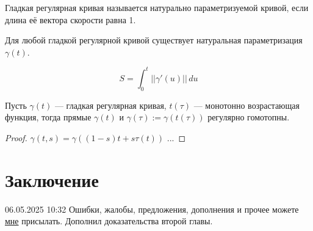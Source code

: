 \begin{definition}
    Гладкая регулярная кривая называется натурально параметризуемой кривой, если длина её вектора скорости равна 1.
\end{definition} 

\begin{statement}
    Для любой гладкой регулярной кривой существует натуральная параметризация $\gamma(t)$.
\end{statement} 

$$S = \int_{0}^{t} ||\gamma'(u)|| \,du$$

\begin{statement}
    Пусть $\gamma(t)$ — гладкая регулярная кривая, $t(\tau)$ — монотонно возрастающая функция, тогда прямые $\gamma(t)$ и $\gamma(\tau):= \gamma(t(\tau))$ регулярно гомотопны.
\end{statement} 
\begin{proof}
    $\gamma(t,s) = \gamma\left((1-s)t + s \tau(t)\right)$ ...
\end{proof} 

\section{Заключение}
06.05.2025 10:32 Ошибки, жалобы, предложения, дополнения и прочее можете \href{https://t.me/egor_tsy}{мне} присылать. Дополнил доказательства второй главы.